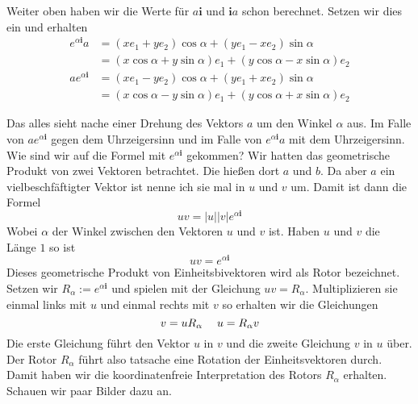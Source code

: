 \documentclass[fleqn]{scrartcl}
\numberwithin{equation}{section}
\def\*#1{\mathbf{#1}}
\begin{document}
Weiter oben haben wir die Werte für $a\*i$ und $\*ia$ schon berechnet. Setzen
wir dies ein und erhalten
\begin{align*}
    e^{\alpha\*i} a &= (xe_1 +ye_2) \cos\alpha + (ye_1 -xe_2) \sin\alpha \\
    &= (x\cos\alpha+y\sin\alpha)e_1 + (y\cos\alpha - x\sin\alpha) e_2 \\
    a e^{\alpha\*i} &= (xe_1 -ye_2)\cos\alpha + (ye_1 + xe_2) \sin\alpha \\
    &= (x\cos\alpha-y\sin\alpha)e_1 + (y\cos\alpha +x\sin\alpha) e_2
\end{align*}

Das alles sieht nache einer Drehung des Vektors $a$ um den Winkel $\alpha$
aus. Im Falle von $ae^{\alpha\*i}$ gegen dem Uhrzeigersinn und im Falle von
$e^{\alpha\*i}a$ mit dem Uhrzeigersinn. Wie sind wir auf die Formel mit
$e^{\alpha\*i}$ gekommen? Wir hatten das geometrische Produkt von zwei
Vektoren betrachtet. Die hießen dort $a$ und $b$. Da aber $a$ ein
vielbeschfäftigter Vektor  ist nenne ich sie mal in $u$ und $v$ um. Damit ist
dann die Formel
\[
    uv=|u||v|e^{\alpha\*i}
\]
Wobei $\alpha$ der Winkel zwischen den Vektoren $u$ und $v$ ist. Haben $u$ und
$v$ die Länge $1$ so ist
\[
    uv=e^{\alpha\*i}
\]
Dieses geometrische Produkt von Einheitsbivektoren wird als Rotor bezeichnet.
Setzen wir $R_\alpha := e^{\alpha\*i}$ und spielen mit der Gleichung
$uv=R_\alpha$.  Multiplizieren sie einmal links mit $u$ und einmal rechts mit
$v$ so erhalten wir die Gleichungen
\[
    v = uR_\alpha\hspace{3ex}u = R_\alpha v
\]
Die erste Gleichung führt den Vektor $u$ in $v$ und die zweite Gleichung $v$ in
$u$ über. Der Rotor $R_\alpha$ führt also tatsache eine Rotation der
Einheitsvektoren durch. Damit haben wir die koordinatenfreie Interpretation des
Rotors $R_\alpha$ erhalten.  Schauen wir paar Bilder dazu
an.
\begin{center}
\begin{minipage}{\linewidth}
\centering
{}
\label{fig:rotatealpha}
\end{minipage}
\end{center}
\end{document}
